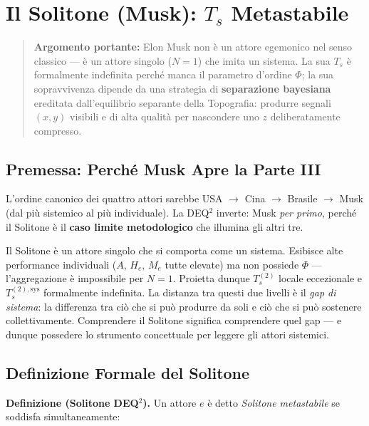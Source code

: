 \chapter{\texorpdfstring{Il Solitone (Musk): \(T_s\)
Metastabile}{Il Solitone (Musk): T\_s Metastabile}}\label{il-solitone-musk-t_s-metastabile}

\begin{quote}
\textbf{Argomento portante:} Elon Musk non è un attore egemonico nel
senso classico --- è un attore singolo (\(N=1\)) che imita un sistema.
La sua \(T_s\) è formalmente indefinita perché manca il parametro
d'ordine \(\Phi\); la sua sopravvivenza dipende da una strategia di
\textbf{separazione bayesiana} ereditata dall'equilibrio separante della
Topografia: produrre segnali \((x, y)\) visibili e di alta qualità per
nascondere uno \(z\) deliberatamente compresso.
\end{quote}



\section{Premessa: Perché Musk Apre la Parte
III}\label{premessa-perchuxe9-musk-apre-la-parte-iii}

L'ordine canonico dei quattro attori sarebbe USA $\to$ Cina $\to$ Brasile $\to$ Musk
(dal più sistemico al più individuale). La DEQ$^2$ inverte: Musk \emph{per
primo}, perché il Solitone è il \textbf{caso limite metodologico} che
illumina gli altri tre.

Il Solitone è un attore singolo che si comporta come un sistema.
Esibisce alte performance individuali (\(A\), \(H_e\), \(M_e\) tutte
elevate) ma non possiede \(\Phi\) --- l'aggregazione è impossibile per
\(N = 1\). Proietta dunque \(T_s^{(2)}\) locale eccezionale e
\(T_s^{(2),\text{sys}}\) formalmente indefinita. La distanza tra questi
due livelli è il \emph{gap di sistema}: la differenza tra ciò che si può
produrre da soli e ciò che si può sostenere collettivamente. Comprendere
il Solitone significa comprendere quel gap --- e dunque possedere lo
strumento concettuale per leggere gli attori sistemici.



\section{Definizione Formale del
Solitone}\label{definizione-formale-del-solitone}

\Hypoth{} \textbf{Definizione (Solitone DEQ$^2$).} Un attore \(e\) è detto
\emph{Solitone metastabile} se soddisfa simultaneamente:

